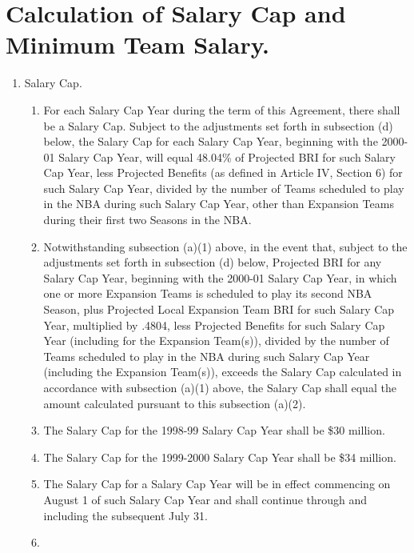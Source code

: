 \documentclass[
]{book}
\providecommand{\tightlist}{%
  \setlength{\itemsep}{0pt}\setlength{\parskip}{0pt}}
\begin{document}
\hypertarget{calculation-of-salary-cap-and-minimum-team-salary.}{%
\section{Calculation of Salary Cap and Minimum Team Salary.}\label{calculation-of-salary-cap-and-minimum-team-salary.}}

\begin{enumerate}
\def\labelenumi{(\alph{enumi})}
\tightlist
\item
  Salary Cap.

  \begin{enumerate}
  \def\labelenumii{(\arabic{enumii})}
  \tightlist
  \item
    For each Salary Cap Year during the term of this Agreement, there shall be a Salary Cap. Subject to the adjustments set forth in subsection (d) below, the Salary Cap for each Salary Cap Year, beginning with the 2000-01 Salary Cap Year, will equal 48.04\% of Projected BRI for such Salary Cap Year, less Projected Benefits (as defined in Article IV, Section 6) for such Salary Cap Year, divided by the number of Teams scheduled to play in the NBA during such Salary Cap Year, other than Expansion Teams during their first two Seasons in the NBA.
  \item
    Notwithstanding subsection (a)(1) above, in the event that, subject to the adjustments set forth in subsection (d) below, Projected BRI for any Salary Cap Year, beginning with the 2000-01 Salary Cap Year, in which one or more Expansion Teams is scheduled to play its second NBA Season, plus Projected Local Expansion Team BRI for such Salary Cap Year, multiplied by .4804, less Projected Benefits for such Salary Cap Year (including for the Expansion Team(s)), divided by the number of Teams scheduled to play in the NBA during such Salary Cap Year (including the Expansion Team(s)), exceeds the Salary Cap calculated in accordance with subsection (a)(1) above, the Salary Cap shall equal the amount calculated pursuant to this subsection (a)(2).
  \item
    The Salary Cap for the 1998-99 Salary Cap Year shall be \$30 million.
  \item
    The Salary Cap for the 1999-2000 Salary Cap Year shall be \$34 million.
  \item
    The Salary Cap for a Salary Cap Year will be in effect commencing on August 1 of such Salary Cap Year and shall continue through and including the subsequent July 31.
  \item

\end{enumerate}
\end{enumerate}
\end{document}
